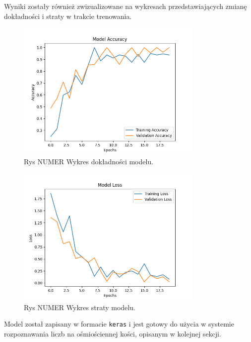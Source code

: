 Wyniki zostały również zwizualizowane na wykresach przedstawiających zmianę dokładności i straty w trakcie trenowania.

\begin{figure}[H]
    \centering
    \includegraphics[width=0.8\textwidth]{chapters/04-czytanie/figures/ModelAcc1}
    \caption{Rys NUMER Wykres dokładności modelu.}
    \label{fig:ModelAcc}
\end{figure}

\begin{figure}[H]
    \centering
    \includegraphics[width=0.8\textwidth]{chapters/04-czytanie/figures/ModelLoss1}
    \caption{Rys NUMER Wykres straty modelu.}
    \label{fig:ModelLoss}
\end{figure}

Model został zapisany w formacie \texttt{keras} i jest gotowy do użycia w systemie rozpoznawania liczb na ośmiościennej kości,
opisanym w kolejnej sekcji.

